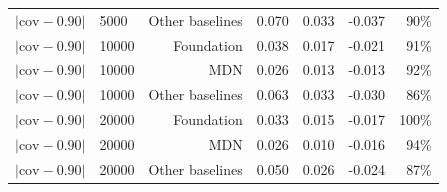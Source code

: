 \begin{tabular}{llrrrrr}
$|\mathrm{cov}-0.90|$ & 5000 & Other baselines & 0.070 & 0.033 & -0.037 & 90\% \\
$|\mathrm{cov}-0.90|$ & 10000 & Foundation & 0.038 & 0.017 & -0.021 & 91\% \\
$|\mathrm{cov}-0.90|$ & 10000 & MDN & 0.026 & 0.013 & -0.013 & 92\% \\
$|\mathrm{cov}-0.90|$ & 10000 & Other baselines & 0.063 & 0.033 & -0.030 & 86\% \\
$|\mathrm{cov}-0.90|$ & 20000 & Foundation & 0.033 & 0.015 & -0.017 & 100\% \\
$|\mathrm{cov}-0.90|$ & 20000 & MDN & 0.026 & 0.010 & -0.016 & 94\% \\
$|\mathrm{cov}-0.90|$ & 20000 & Other baselines & 0.050 & 0.026 & -0.024 & 87\% \\
\bottomrule
\end{tabular}